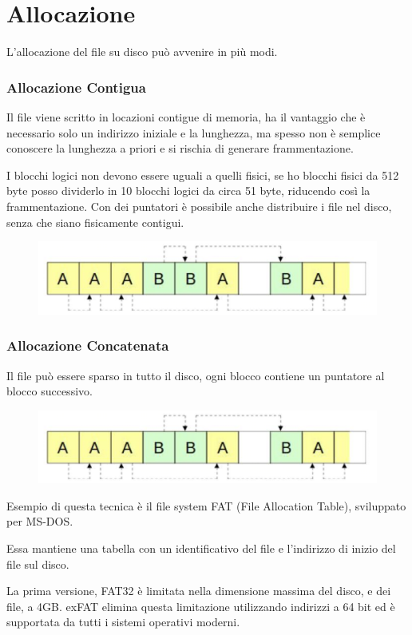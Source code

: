 \section{Allocazione}
L'allocazione del file su disco può avvenire in più modi.

\subsubsection{Allocazione Contigua}
Il file viene scritto in locazioni contigue di memoria, ha il vantaggio che è necessario solo un indirizzo iniziale e la lunghezza, ma spesso non è semplice conoscere la lunghezza a priori e si rischia di generare frammentazione.

I blocchi logici non devono essere uguali a quelli fisici, se ho blocchi fisici da 512 byte posso dividerlo in 10 blocchi logici da circa 51 byte, riducendo così la frammentazione. Con dei puntatori è possibile anche distribuire i file nel disco, senza che siano fisicamente contigui.

\begin{figure}[H]
    \centering
    \includegraphics[width=0.4\linewidth]{assets/allocazione-contigua.png}
\end{figure}

\subsubsection{Allocazione Concatenata}
Il file può essere sparso in tutto il disco, ogni blocco contiene un puntatore al blocco successivo.

\begin{figure}[H]
    \centering
    \includegraphics[width=0.4\linewidth]{assets/allocazione-contigua.png}
\end{figure}


Esempio di questa tecnica è il file system FAT (File Allocation Table), sviluppato per MS-DOS.

Essa mantiene una tabella con un identificativo del file e l'indirizzo di inizio del file sul disco.

\spacer
La prima versione, FAT32 è limitata nella dimensione massima del disco, e dei file, a 4GB. exFAT elimina questa limitazione utilizzando indirizzi a 64 bit ed è supportata da tutti i sistemi operativi moderni.

